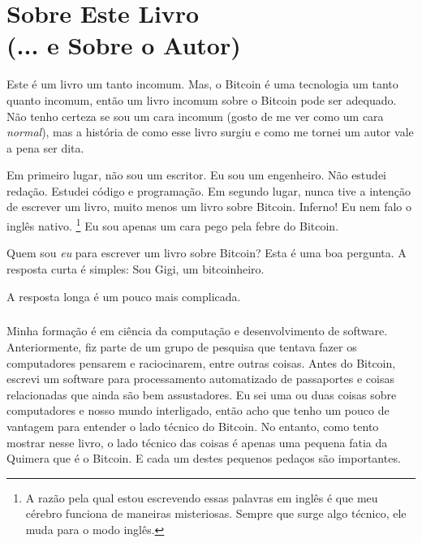 
\def\bitcoinB{\leavevmode
  {\setbox0=\hbox{\textsf{B}}%
    \dimen0\ht0 \advance\dimen0 0.2ex
    \ooalign{\hfil \box0\hfil\cr
      \hfil\vrule height \dimen0 depth.2ex\hfil\cr
    }%
  }%
}

\chapter*{Sobre Este Livro \\ (... e Sobre o Autor)}

Este é um livro um tanto incomum. Mas, o Bitcoin é uma tecnologia um tanto quanto incomum, então um livro incomum sobre o Bitcoin pode ser adequado. Não tenho certeza se sou um cara incomum (gosto de me ver como um cara \textit {normal}), mas a história de como esse livro surgiu e como me tornei um autor vale a pena ser dita.

Em primeiro lugar, não sou um escritor. Eu sou um engenheiro. Não estudei redação. Estudei código e programação. Em segundo lugar, nunca tive a intenção de escrever um livro, muito menos um livro sobre Bitcoin. Inferno! Eu nem falo o inglês nativo. \footnote{A razão pela qual estou escrevendo essas palavras em inglês é que meu cérebro funciona de maneiras misteriosas. Sempre que surge algo técnico, ele muda para o modo inglês.} Eu sou apenas um cara pego pela febre do Bitcoin. 

Quem sou \textit {eu} para escrever um livro sobre Bitcoin? Esta é uma boa pergunta. A resposta curta é simples: Sou Gigi, um bitcoinheiro.

A resposta longa é um pouco mais complicada.

\paragraph{}
Minha formação é em ciência da computação e desenvolvimento de software. Anteriormente, fiz parte de um grupo de pesquisa que tentava fazer os computadores pensarem e raciocinarem, entre outras coisas. Antes do Bitcoin, escrevi um software para processamento automatizado de passaportes e coisas relacionadas que ainda são bem assustadores. Eu sei uma ou duas coisas sobre computadores e nosso mundo interligado, então acho que tenho um pouco de vantagem para entender o lado técnico do Bitcoin. No entanto, como tento mostrar nesse livro, o lado técnico das coisas é apenas uma pequena fatia da Quimera que é o Bitcoin. E cada um destes pequenos pedaços são importantes.

